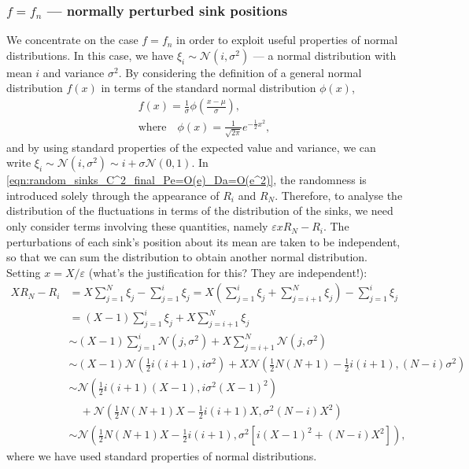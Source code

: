 \subsubsection{\(f=f_n\) --- normally perturbed sink positions}
We concentrate on the case \(f = f_n\) in order to exploit useful properties of
normal distributions. In this case, we have \(\xi_i \sim
\mathcal{N}(i,\sigma^2)\) --- a normal distribution with mean \(i\) and
variance \(\sigma^2\). By considering the definition of a general normal
distribution \(f(x)\) in terms of the standard normal distribution \(\phi(x)\),
\begin{gather*}
    f(x) = \frac{1}{\sigma}\phi\left(\frac{x-\mu}{\sigma}\right),\\
    \text{where}\quad \phi(x) = \frac{1}{\sqrt{2\pi}}e^{-\frac{1}{2}x^2},
\end{gather*}
and by using standard properties of the expected value and variance,
we can write \(\xi_i \sim \mathcal{N}(i,\sigma^2) \sim i + \sigma
\mathcal{N}(0,1)\). In \eqref{eqn:random_sinks_C^2_final_Pe=O(e)_Da=O(e^2)},
the randomness is introduced solely through the appearance of \(R_i\) and
\(R_N\). Therefore, to analyse the distribution of the fluctuations in terms
of the distribution of the sinks, we need only consider terms involving these
quantities, namely \(\varepsilon x R_N - R_i\). The perturbations of each
sink's position about its mean are taken to be independent, so that we can
sum the distribution to obtain another normal distribution. Setting \(x =
X/\varepsilon\) (what's the justification for this? They are independent!):
\begin{align*}
    X R_N - R_i &= X \sum_{j=1}^N \xi_j - \sum_{j=1}^i \xi_j = X
    \left(\sum_{j=1}^i \xi_j + \sum_{j=i+1}^N \xi_j\right) - \sum_{j=1}^i
    \xi_j\\
    &=(X-1)\sum_{j=1}^i \xi_j + X\sum_{j=i+1}^N \xi_j\\
    &\sim (X-1)\sum_{j=1}^i \mathcal{N}(j,\sigma^2) + X\sum_{j=i+1}^N
    \mathcal{N}(j,\sigma^2)\\
    &\sim
    (X-1)\mathcal{N}\left(\tfrac{1}{2}i(i+1),i\sigma^2\right) + X
    \mathcal{N}\left(\tfrac{1}{2}N(N+1) -
    \tfrac{1}{2}i(i+1),(N-i)\sigma^2\right)\\
    &\sim \mathcal{N}\left(\tfrac{1}{2}i(i+1)(X-1),
    i\sigma^2(X-1)^2\right)\\
    &\quad + \mathcal{N}\left(\tfrac{1}{2}N(N+1)X -
    \tfrac{1}{2}i(i+1)X, \sigma^2(N-i)X^2\right)\\
    & \sim \mathcal{N}\left(\tfrac{1}{2}N(N+1)X - \tfrac{1}{2}i(i+1),
    \sigma^2\left[i(X-1)^2 + (N-i)X^2\right]\right),
\end{align*}
where we have used standard properties of normal distributions.

